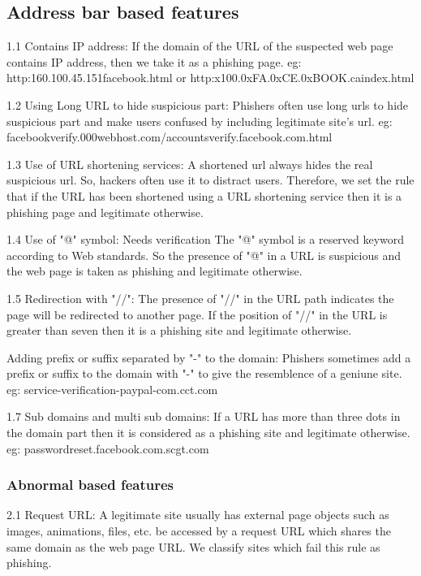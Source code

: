\documentclass[conference]{IEEEtran}
\begin{document}
\subsection{Address bar based features}
\par 1.1 Contains IP address: If the domain of the URL of
the suspected web page contains IP address, then we take
it as a phishing page. eg: http:160.100.45.151facebook.html or
http:x100.0xFA.0xCE.0xBOOK.caindex.html

\par 1.2 Using Long URL to hide suspicious part: Phishers often use long urls to hide suspicious part and make users confused by including legitimate site's url.
eg: facebookverify.000webhost.com/accountsverify.facebook.com.html

\par 1.3 Use of URL shortening services: A shortened url always hides the real suspicious url. So, hackers often use it to distract users. Therefore, we
set the rule that if the URL has been shortened using a URL
shortening service then it is a phishing page and legitimate
otherwise.

\par 1.4 Use of "@" symbol: Needs verification The "@"
symbol is a reserved keyword according to Web standards.
So the presence of "@" in a URL is suspicious and the web
page is taken as phishing and legitimate otherwise.

\par 1.5 Redirection with "//": The presence of "//" in the URL
path indicates the page will be redirected to another page. If
the position of "//" in the URL is greater than seven then it is
a phishing site and legitimate otherwise.

\par Adding prefix or suffix separated by "-" to the domain:
Phishers sometimes add a prefix or suffix to the domain with "-" to
give the resemblence of a geniune site. eg: service-verification-paypal-com.cct.com

\par 1.7 Sub domains and multi sub domains: If a URL has
more than three dots in the domain part then it is considered
as a phishing site and legitimate otherwise. eg: passwordreset.facebook.com.scgt.com
\subsubsection{Abnormal based features}

\par 2.1 Request URL: A legitimate site usually has external
page objects such as images, animations, files, etc. be accessed
by a request URL which shares the same domain as the web
page URL. We classify sites which fail this rule as phishing.
\end{document}
